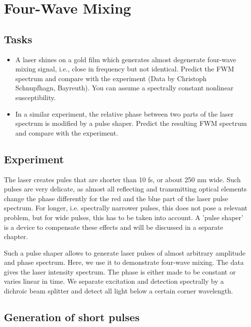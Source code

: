 \renewcommand{\lastmod}{May 22, 2020}
\chapter{Four-Wave Mixing}


\section{Tasks}

\begin{itemize}
\item A laser shines on a gold film which generates almost degenerate four-wave mixing signal, i.e., close in frequency but not identical. Predict the FWM spectrum and compare with the experiment (Data by Christoph Schnupfhagn, Bayreuth). You can assume a spectrally constant nonlinear  susceptibility.

\item In a similar experiment, the relative phase between two parts of the laser spectrum is modified by a pulse shaper. Predict the resulting FWM spectrum and compare with the experiment.
\end{itemize}

\section{Experiment}

The laser creates pules that are shorter than 10 fs, or about 250 nm wide. Such pulses are very delicate, as almost all reflecting and transmitting optical elements change the phase differently for the red and the blue part of the laser pulse spectrum. For longer, i.e. spectrally narrower pulses, this does not pose a relevant problem, but for wide pulses, this has to be taken into account. A 'pulse shaper' is a device to compensate these effects and will be discussed in a separate chapter.

Such a pulse shaper allows to generate laser pulses of almost arbitrary amplitude and phase spectrum. Here, we use it to demonstrate four-wave mixing. The data gives the laser intensity spectrum. The phase is either made to be constant or varies linear  in time.
We separate excitation and detection spectrally by a dichroic beam splitter and detect all light below a certain corner wavelength. 

\section{Generation of short pulses}


